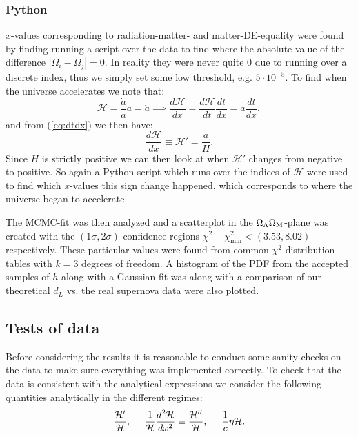 \documentclass[%
reprint,
 amsmath,amssymb,
 aps,
]{revtex4-2}
\newcommand{\Hp}{\mathcal{H}}
\begin{document}
\subsubsection{Python}
$x$-values corresponding to radiation-matter- and matter-DE-equality were found by finding running a script over the data to find where the absolute value of the difference $|\Omega_i-\Omega_j|=0$. In reality they were never quite 0 due to running over a discrete index, thus we simply set some low threshold, e.g. $5\cdot10^{-5}$. To find when the universe accelerates we note that:
\[\Hp=\frac{\dot a}{a}a=\dot a\implies \frac{d\Hp}{dx}=\frac{d\Hp}{dt}\frac{dt}{dx}=\ddot{a}\frac{dt}{dx},\]
and from (\ref{eq:dtdx}) we then have:
\[\frac{d\Hp}{dx}\equiv\Hp'=\frac{\ddot a}{H}.\]
Since $H$ is strictly positive we can then look at when $\Hp'$ changes from negative to positive. So again a Python script which runs over the indices of $\Hp$ were used to find which $x$-values this sign change happened, which corresponds to where the universe began to accelerate. 

The MCMC-fit was then analyzed and a scatterplot in the $\Omega_\Lambda\Omega_\text M$-plane was created with the $(1\sigma,2\sigma)$ confidence regions $\chi^2-\chi^2_\text{min}<(3.53,8.02)$ respectively. These particular values were found from common $\chi^2$ distribution tables with $k=3$ degrees of freedom. A histogram of the PDF  from the accepted samples of $h$ along with a Gaussian fit was along with a comparison of our theoretical $d_L$ vs. the real supernova data were also plotted.

\subsection{Tests of data}

Before considering the results it is reasonable to conduct some sanity checks on the data to make sure everything was implemented correctly. To check that the data is consistent with the analytical expressions we consider the following quantities analytically in the different regimes:
\[\frac{\Hp'}{\Hp},\hspace{5mm}\frac{1}{\Hp}\frac{d^2\Hp}{dx^2}\equiv\frac{\Hp''}{\Hp},\hspace{5mm}\frac{1}{c}\eta\Hp.\]
\end{document}
